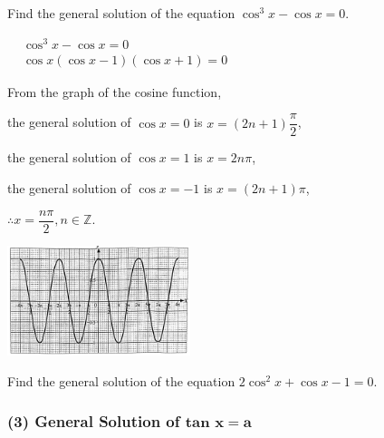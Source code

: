 \documentclass{report}
\begin{document}
\begin{question}
	Find the general solution of the equation $\cos ^3 x-\cos x=0$.
	
	\sol{}
	\begin{multicols}{2}
		\noindent $\begin{aligned} & \cos ^3 x-\cos x=0 \\ & \cos x(\cos x-1)(\cos x+1)=0\end{aligned}$
		   
		\noindent From the graph of the cosine function,
		
		\vspace{-1em}
		\noindent the general solution of $\cos x=0$ is $x=(2n+1)\dfrac{\pi}{2}$,
		    
		\vspace{-1em}
		\noindent the general solution of $\cos x=1$ is $x=2n\pi$,
		
		\vspace{-1em}
		\noindent the general solution of $\cos x=-1$ is $x=(2n+1)\pi$,
		
		\vspace{-1em}
		\noindent $\therefore x=\dfrac{n\pi}{2}, n \in \mathbb{Z}$.
		\columnbreak
		
		\includegraphics[width=0.4\textwidth]{assets/11-14.jpg}
	\end{multicols}
\end{question}


Find the general solution of the equation $2 \cos ^2 x+\cos x-1=0$.

\subsubsection*{(3) General Solution of $\mathbf{\text{tan } x=a}$}
\end{document}
